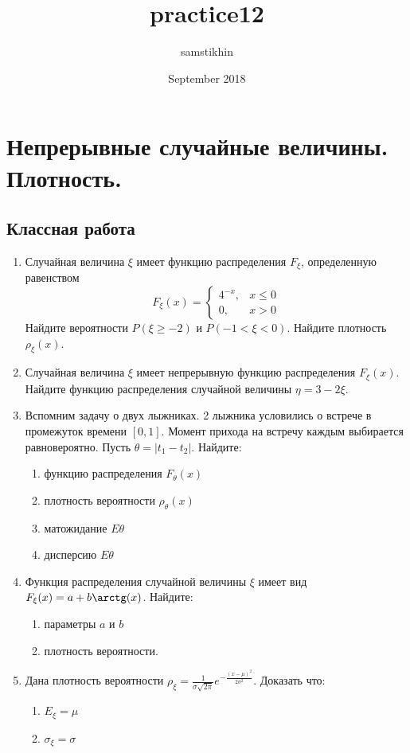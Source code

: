 \documentclass[a4paper, 14pt]{extarticle}
\title{practice12}
\author{samstikhin}
\date{September 2018}
\begin{document}
\section*{Непрерывные случайные величины. Плотность.}
\subsection*{Классная работа}
\begin{enumerate}
\item Случайная величина $\xi$ имеет функцию распределения $F_{\xi}$, определенную равенством
$$F_\xi(x) =\left\{
	\begin{array}{cc}
	4^{-x}, & x\leq 0 \\
	0, & x>0
	\end{array}\right.$$
Найдите вероятности 
$P(\xi \geq -2)$ и $P(-1 < \xi < 0)$. Найдите плотность $\rho_{\xi}(x)$.
\item Случайная величина $\xi$ имеет непрерывную функцию распределения $F_{\xi}(x)$. 
Найдите функцию распределения случайной величины $\eta=3-2\xi$.
\item Вспомним задачу о двух лыжниках. 2 лыжника условились о встрече в промежуток времени $[0,1]$.
    Момент прихода на встречу каждым выбирается равновероятно. 
    Пусть $\theta = |t_1 - t_2|$. Найдите:
    \begin{enumerate}
    \item функцию распределения $F_{\theta}(x)$
    \item плотность вероятности $\rho_{\theta}(x)$
    \item матожидание $E\theta$
    \item дисперсию $E\theta$
    \end{enumerate}
\item Функция распределения случайной величины $\xi$ имеет вид $F_{\xi}(x)=a + b\arctg(x)$. 
Найдите:
\begin{enumerate}
\item параметры $a$ и $b$
\item плотность вероятности.
\end{enumerate} 

\item Дана плотность вероятности $\rho_{\xi} = \frac{1}{\sigma \sqrt{2\pi}} e^{-\frac{(x-\mu)^2}{2\sigma^2}}$.
Доказать что:
\begin{enumerate}
\item $E_{\xi}= \mu$
\item $\sigma_{\xi}= \sigma$

\end{enumerate} 



\newpage

\end{enumerate}
\end{document}
